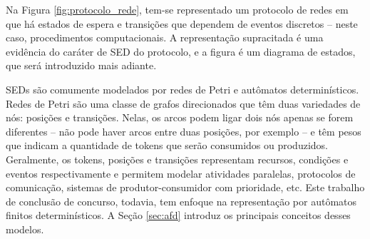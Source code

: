 
Na Figura \ref{fig:protocolo_rede}, tem-se representado um protocolo de redes em que há estados de espera e transições que dependem de eventos discretos -- neste caso, procedimentos computacionais. A representação supracitada é uma evidência do caráter de SED do protocolo, e a figura é um diagrama de estados, que será introduzido mais adiante.

SEDs são comumente modelados por redes de Petri e autômatos determinísticos. Redes de Petri são uma classe de grafos direcionados que têm duas variedades de nós: posições e transições. Nelas, os arcos podem ligar dois nós apenas se forem diferentes -- não pode haver arcos entre duas posições, por exemplo -- e têm pesos que indicam a quantidade de tokens que serão consumidos ou produzidos. Geralmente, os tokens, posições e transições representam recursos, condições e eventos respectivamente e permitem modelar atividades paralelas, protocolos de comunicação, sistemas de produtor-consumidor com prioridade, etc. \cite{petrinets} Este trabalho de conclusão de concurso, todavia, tem enfoque na representação por autômatos finitos determinísticos. A Seção \ref{sec:afd} introduz os principais conceitos desses modelos.

